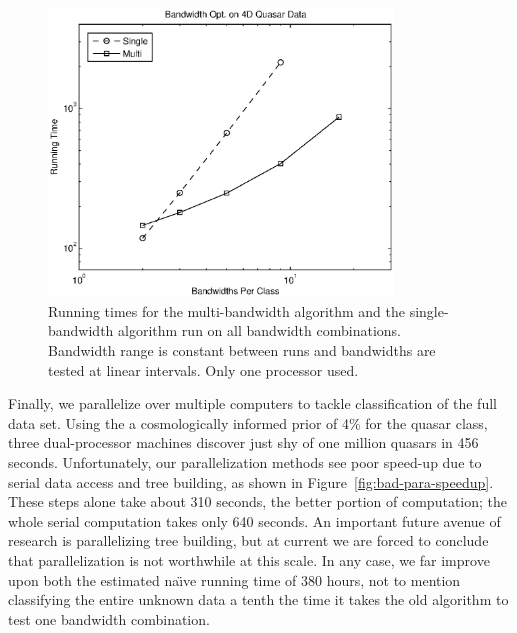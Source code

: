 \documentclass[twoside,leqno,twocolumn]{article}
\begin{document}
\begin{figure}[tb]
  \begin{center}
    \hspace*{-.3in}
    \includegraphics[width=3.6in]{multi_speed.eps}
    \hspace*{-.3in}
  \end{center}
  \vspace{-17pt}
  \caption{\label{fig:multi-speed}\footnotesize Running times for the
    multi-bandwidth algorithm and the single-bandwidth algorithm run
    on all bandwidth combinations.  Bandwidth range is constant
    between runs and bandwidths are tested at linear intervals.  Only
    one processor used.}
\end{figure}

Finally, we parallelize over multiple computers to tackle
classification of the full data set.  Using the a cosmologically
informed prior of 4\% for the quasar class, three dual-processor
machines discover just shy of one million quasars in 456 seconds.
Unfortunately, our parallelization methods see poor speed-up due to
serial data access and tree building, as shown in
Figure~\ref{fig:bad-para-speedup}.  These steps alone take about 310
seconds, the better portion of computation; the whole serial
computation takes only 640 seconds.  An important future avenue of
research is parallelizing tree building, but at current we are forced
to conclude that parallelization is not worthwhile at this scale.  In
any case, we far improve upon both the estimated na\"{\i}ve running
time of 380 hours, not to mention classifying the entire unknown data
a tenth the time it takes the old algorithm to test one bandwidth
combination.
\end{document}
